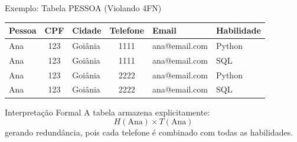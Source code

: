 \documentclass[9pt]{beamer}
\begin{document}
\begin{frame}{Exemplo: Tabela PESSOA (Violando 4FN)}
  \centering
  \begin{tabular}{|l|c|l|c|l|l|}
    \hline
    \textbf{Pessoa} & \textbf{CPF} & \textbf{Cidade} & \textbf{Telefone} & \textbf{Email} & \textbf{Habilidade} \\ \hline
    Ana & 123 & Goiânia & 1111 & ana@email.com & \color{red}Python \\ \hline
    Ana & 123 & Goiânia & 1111 & ana@email.com & \color{red}SQL \\ \hline
    Ana & 123 & Goiânia & 2222 & ana@email.com & \color{red}Python \\ \hline
    Ana & 123 & Goiânia & 2222 & ana@email.com & \color{red}SQL \\ \hline
  \end{tabular}

  \vspace{0.4cm}
  
  \begin{alertblock}{Interpretação Formal}
    A tabela armazena explicitamente:
    \[
    H(\text{Ana}) \times T(\text{Ana})
    \]
    gerando redundância, pois cada telefone é combinado com todas as habilidades.
  \end{alertblock}

\end{frame}
\end{document}
